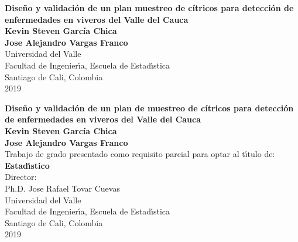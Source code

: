 
\begin{center}
\begin{figure}
\centering
{}
\end{figure}

\thispagestyle{empty}
\vspace*{2.0cm}

\textbf{\huge Dise\~{n}o y validaci\'{o}n de un plan muestreo de c\'{i}tricos para detecci\'{o}n de enfermedades en viveros del Valle del Cauca}\\[5.0cm]

\Large\textbf{Kevin Steven Garc\'{i}a Chica}\\
\Large\textbf{Jose Alejandro Vargas Franco}\\[4.0cm]
\small Universidad del Valle\\
Facultad de Ingenier\'{\i}a, Escuela de Estad\'{\i}stica\\
Santiago de Cali, Colombia\\
2019\\
\end{center}

\newpage{\pagestyle{empty}\cleardoublepage}

\newpage

\begin{center}
\thispagestyle{empty}
\vspace*{0cm}

\textbf{\huge Dise\~{n}o y validaci\'{o}n de un plan de muestreo de c\'{i}tricos para detecci\'{o}n de enfermedades en viveros del Valle del Cauca}\\[3.5cm]

\Large\textbf{Kevin Steven Garc\'{i}a Chica}\\
\Large\textbf{Jose Alejandro Vargas Franco}\\[3.0cm]
\small Trabajo de grado presentado como requisito parcial para optar al t\'{\i}tulo de:\\
\textbf{Estad\'{\i}stico}\\[2.5cm]
Director:\\
Ph.D. Jose Rafael Tovar Cuevas\\[4.0cm]
Universidad del Valle\\
Facultad de Ingenier\'{\i}a, Escuela de Estad\'{\i}stica\\
Santiago de Cali, Colombia\\
2019\\
\end{center}

\newpage{\pagestyle{empty}\cleardoublepage}